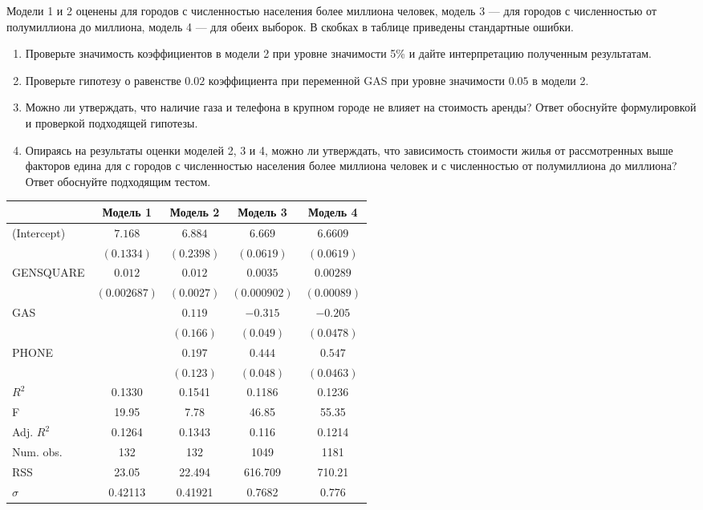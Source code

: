 \begin{enumerate}
Модели 1 и 2 оценены для городов с численностью населения более миллиона человек, модель 3 — для городов с численностью от полумиллиона до миллиона, модель 4 — для обеих выборок. В скобках в таблице приведены стандартные ошибки.

\begin{enumerate}
\item Проверьте значимость коэффициентов в модели 2 при уровне значимости 5\% и дайте интерпретацию полученным результатам.
\item Проверьте гипотезу о равенстве $0.02$ коэффициента при переменной GAS при уровне значимости $0.05$ в модели 2.
\item Можно ли утверждать, что наличие газа и телефона в крупном городе не влияет на стоимость аренды? Ответ обоснуйте  формулировкой и проверкой подходящей гипотезы.
\item Опираясь на результаты оценки моделей 2, 3 и 4, можно ли утверждать, что зависимость стоимости жилья от рассмотренных выше факторов едина для с городов с численностью населения более миллиона человек и с численностью от полумиллиона до миллиона? Ответ обоснуйте подходящим тестом.
\end{enumerate}

\begin{tabular}{l c c c c }
\toprule
 & Модель 1 & Модель 2 & Модель 3 & Модель 4 \\
\midrule
(Intercept) & $7.168$      & $6.884$    & $6.669$      & $6.6609$    \\
            & $(0.1334)$   & $(0.2398)$ & $(0.0619)$   & $(0.0619)$ \\
GENSQUARE   &  $0.012$     & $0.012$    & $0.0035$     & $0.00289$   \\
            & $(0.002687)$ & $(0.0027)$ & $(0.000902)$ & $(0.00089)$ \\
GAS         &              & $0.119$    & $-0.315$      & $-0.205$    \\
            &              & $(0.166)$  & $(0.049)$    & $(0.0478)$  \\
PHONE       &              & $0.197$    & $0.444$      & $0.547$    \\
            &              & $(0.123)$  & $(0.048)$   & $(0.0463)$  \\
\midrule
$R^2$        & 0.1330         & 0.1541      & 0.1186         & 0.1236     \\
F            & 19.95          & 7.78        & 46.85          & 55.35     \\
Adj. $R^2$   & 0.1264         & 0.1343      & 0.116         & 0.1214    \\
Num. obs.    & 132            & 132         & 1049           & 1181       \\
RSS          & 23.05          & 22.494      & 616.709       & 710.21    \\
$\hat\sigma$ & 0.42113        & 0.41921     & 0.7682        & 0.776    \\
\bottomrule
\end{tabular}


\end{enumerate}

